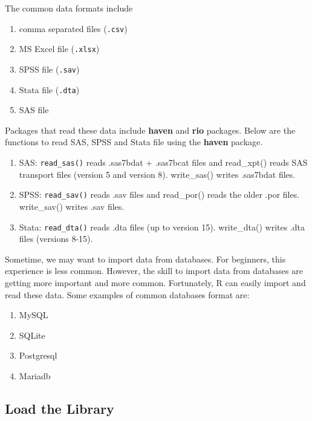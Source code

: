\documentclass[
  10pt,
]{krantz}
\providecommand{\tightlist}{%
  \setlength{\itemsep}{0pt}\setlength{\parskip}{0pt}}
\begin{document}
The common data formats include

\begin{enumerate}
\def\labelenumi{\arabic{enumi}.}
\tightlist
\item
  comma separated files (\texttt{.csv})
\item
  MS Excel file (\texttt{.xlsx})
\item
  SPSS file (\texttt{.sav})
\item
  Stata file (\texttt{.dta})
\item
  SAS file
\end{enumerate}

Packages that read these data include \textbf{haven} and \textbf{rio} packages. Below are the functions to read SAS, SPSS and Stata file using the \textbf{haven} package.

\begin{enumerate}
\def\labelenumi{\arabic{enumi}.}
\tightlist
\item
  SAS: \texttt{read\_sas()} reads .sas7bdat + .sas7bcat files and read\_xpt() reads SAS transport files (version 5 and version 8). write\_sas() writes .sas7bdat files.
\item
  SPSS: \texttt{read\_sav()} reads .sav files and read\_por() reads the older .por files. write\_sav() writes .sav files.
\item
  Stata: \texttt{read\_dta()} reads .dta files (up to version 15). write\_dta() writes .dta files (versions 8-15).
\end{enumerate}

Sometime, we may want to import data from databases. For beginners, this experience is less common. However, the skill to import data from databases are getting more important and more common. Fortunately, R can easily import and read these data. Some examples of common databases format are:

\begin{enumerate}
\def\labelenumi{\arabic{enumi}.}
\tightlist
\item
  MySQL
\item
  SQLite
\item
  Postgresql
\item
  Mariadb
\end{enumerate}

\hypertarget{load-the-library}{%
\subsection{Load the Library}\label{load-the-library}}
\end{document}
